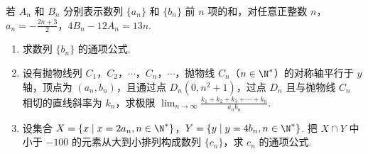 \documentclass[UTF8,a4paper,oneside,11pt]{ctexbook}
\begin{document}
\begin{problem}
若 \(A_{n}\) 和 \(B_{n}\) 分别表示数列 \(\{a_{n}\}\) 和 \(\{b_{n}\}\) 前 \(n\) 项的和，对任意正整数 \(n\)，\(a_{n} = -\frac{2n+3}{2}\)，\(4B_{n} - 12A_{n} = 13n\).

\begin{enumerate}
\item 求数列 \(\{b_{n}\}\) 的通项公式.
\item 设有抛物线列 \(C_{1}\)，\(C_{2}\)，\(\cdots\)，\(C_{n}\)，\(\cdots\)，抛物线 \(C_{n}\)（\(n \in \N^{*}\)）的对称轴平行于 \(y\) 轴，顶点为 \((a_{n}, b_{n})\)，且通过点 \(D_{n}(0, n^{2} + 1)\)，过点 \(D_{n}\) 且与抛物线 \(C_{n}\) 相切的直线斜率为 \(k_{n}\)，求极限 \(\displaystyle\lim_{n \to \infty} \frac{k_1 + k_2 + k_3 + \cdots + k_n}{a_n b_n}\).
\item 设集合 \(X = \{x \mid x = 2a_n, n \in \N^{*}\}\)，\(Y = \{y \mid y = 4b_n, n \in \N^{*}\}\). 把 \(X \cap Y\) 中小于 \(-100\) 的元素从大到小排列构成数列 \(\{c_n\}\)，求 \(c_n\) 的通项公式.
\end{enumerate}
\end{problem}
\end{document}
